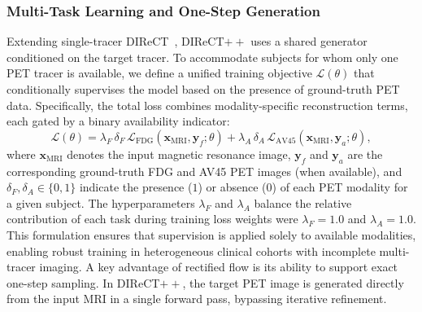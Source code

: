 \documentclass{article}
\providecommand{\DIFaddtex}[1]{{\protect\color{blue} \sf #1}} %
\providecommand{\DIFdeltex}[1]{{\protect\color{red} \scriptsize #1}} %
\providecommand{\DIFaddbegin}{} %
\providecommand{\DIFaddend}{} %
\providecommand{\DIFdelbegin}{} %
\providecommand{\DIFdelend}{} %
\providecommand{\DIFadd}[1]{\texorpdfstring{\DIFaddtex{#1}}{#1}} %
\providecommand{\DIFdel}[1]{\texorpdfstring{\DIFdeltex{#1}}{}} %
\newcommand{\DIFscaledelfig}{0.5}
\newlength{\DIFdelgraphicswidth} %
\newlength{\DIFdelgraphicsheight} %
\newcommand{\DIFaddincludegraphics}[2][]{{\color{blue}\fbox{\DIFOincludegraphics[#1]{#2}}}} %
\newcommand{\DIFdelincludegraphics}[2][]{%
\sbox{\DIFdelgraphicsbox}{\DIFOincludegraphics[#1]{#2}}%
\settoboxwidth{\DIFdelgraphicswidth}{\DIFdelgraphicsbox} %
\settoboxtotalheight{\DIFdelgraphicsheight}{\DIFdelgraphicsbox} %
\scalebox{\DIFscaledelfig}{%
\parbox[b]{\DIFdelgraphicswidth}{\usebox{\DIFdelgraphicsbox}\\[-\baselineskip] \rule{\DIFdelgraphicswidth}{0em}}\llap{\resizebox{\DIFdelgraphicswidth}{\DIFdelgraphicsheight}{%
\setlength{\unitlength}{\DIFdelgraphicswidth}%
\begin{picture}(1,1)%
\thicklines\linethickness{2pt} %
{\color[rgb]{1,0,0}\put(0,0){\framebox(1,1){}}}%
{\color[rgb]{1,0,0}\put(0,0){\line( 1,1){1}}}%
{\color[rgb]{1,0,0}\put(0,1){\line(1,-1){1}}}%
\end{picture}%
}\hspace*{3pt}}} %
} %
\DeclareRobustCommand{\DIFaddbegin}{\DIFOaddbegin \let\includegraphics\DIFaddincludegraphics} %
\DeclareRobustCommand{\DIFaddend}{\DIFOaddend \let\includegraphics\DIFOincludegraphics} %
\DeclareRobustCommand{\DIFdelbegin}{\DIFOdelbegin \let\includegraphics\DIFdelincludegraphics} %
\DeclareRobustCommand{\DIFdelend}{\DIFOaddend \let\includegraphics\DIFOincludegraphics} %
\begin{document}
\subsubsection{Multi-Task Learning and One-Step Generation}
\DIFaddbegin \DIFadd{Extending single-tracer DIReCT~\cite{liu2025direct}, DIReCT$++$ uses a shared generator conditioned on the target tracer. }\DIFaddend To accommodate subjects for whom only one PET tracer is available, we define a unified training objective $\mathcal{L}(\theta)$ that conditionally supervises the model based on the presence of ground-truth PET data. Specifically, the total loss combines modality-specific reconstruction terms, each gated by a binary availability indicator:
\begin{equation}
\mathcal{L}(\theta) = \lambda_F \, \delta_F \, \mathcal{L}_{\text{FDG}}(\mathbf{x}_{\text{MRI}}, \mathbf{y}_f; \theta) + \lambda_A \, \delta_A \, \mathcal{L}_{\text{AV45}}(\mathbf{x}_{\text{MRI}}, \mathbf{y}_a; \theta),
\label{eq:multitask_loss}
\end{equation}
where $\mathbf{x}_{\text{MRI}}$ denotes the input magnetic resonance image, $\mathbf{y}_f$ and $\mathbf{y}_a$ are the corresponding ground-truth FDG and AV45 PET images (when available), and $\delta_F, \delta_A \in \{0,1\}$ indicate the presence ($1$) or absence ($0$) of each PET modality for a given subject. The \DIFdelbegin \DIFdel{hyperparameters $\lambda_F$ and $\lambda_A$ balance the relative contribution of each task during training}\DIFdelend \DIFaddbegin \DIFadd{loss weights were $\lambda_F=1.0$ and $\lambda_A=1.0$}\DIFaddend . This formulation ensures that supervision is applied solely to available modalities, enabling \DIFdelbegin \DIFdel{robust }\DIFdelend training in heterogeneous clinical cohorts with incomplete multi-tracer imaging.
\DIFdelbegin \DIFdel{A key advantage of rectified flow is its ability to support exact one-step sampling. In DIReCT$++$, the target PET image is generated directly from the input MRI in a single forward pass, bypassing iterative refinement. %
}%
\end{document}
